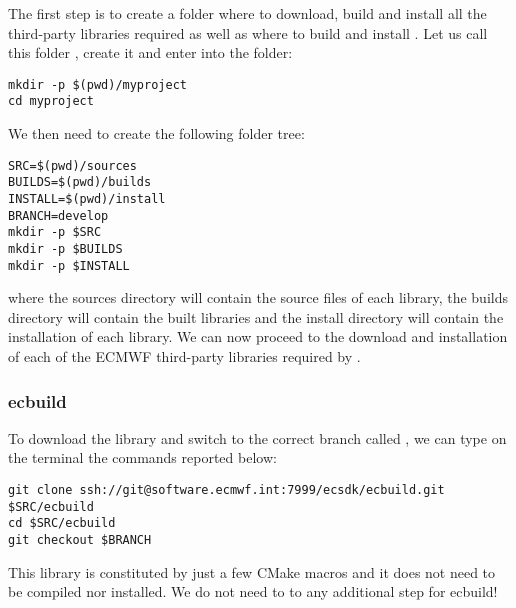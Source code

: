 The first step is to create a folder where to download, build 
and install all the third-party libraries required as well as 
where to build and install \Atlas. Let us call this folder 
, create it and enter into the folder:
%
\begin{lstlisting}[style=BashStyle]
mkdir -p $(pwd)/myproject
cd myproject
\end{lstlisting}
%
We then need to create the following folder tree:
%
\begin{lstlisting}[style=BashStyle]
SRC=$(pwd)/sources
BUILDS=$(pwd)/builds
INSTALL=$(pwd)/install
BRANCH=develop
mkdir -p $SRC 
mkdir -p $BUILDS 
mkdir -p $INSTALL
\end{lstlisting}
%
where the sources directory will contain the source files
of each library, the builds directory will contain the 
built libraries and the install directory will contain 
the installation of each library.
We can now proceed to the download and installation 
of each of the ECMWF third-party libraries required 
by \Atlas.



\subsubsection{ecbuild}
To download the library and switch to the correct branch called 
, we can type on the terminal the commands reported 
below:
%
\begin{lstlisting}[style=BashStyle]
git clone ssh://git@software.ecmwf.int:7999/ecsdk/ecbuild.git $SRC/ecbuild
cd $SRC/ecbuild
git checkout $BRANCH
\end{lstlisting}
%
This library is constituted by just a few CMake macros 
and it does not need to be compiled nor installed.
We do not need to to any additional step for ecbuild!



